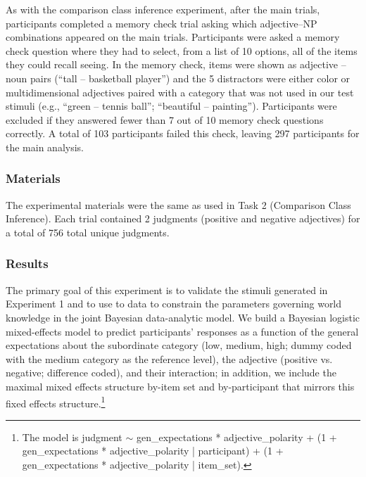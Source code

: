\documentclass[doc]{apa6}
\begin{document}
As with the comparison class inference experiment, after the main trials, participants completed a memory check trial asking which adjective--NP combinations appeared on the main trials. 
Participants were asked a memory check question where they had to select, from a list of 10 options, all of the items they could recall seeing. In the memory check, items were shown as adjective -- noun pairs (``tall -- basketball player'') and the 5 distractors were either color or multidimensional adjectives paired with a category that was not used in our test stimuli (e.g., ``green -- tennis ball''; ``beautiful -- painting'').
Participants were excluded if they answered fewer than 7 out of 10 memory check questions correctly.
A total of 103 participants failed this check, leaving 297 participants for the main analysis. 

\subsubsection{Materials}

The experimental materials were the same as used in Task 2 (Comparison Class Inference).
Each trial contained 2 judgments (positive and negative adjectives) for a total of 756 total unique judgments.

\subsubsection{Results}

The primary goal of this experiment is to validate the stimuli generated in Experiment 1 and to use to data to constrain the parameters governing world knowledge in the joint Bayesian data-analytic model. We build a Bayesian logistic mixed-effects model to predict participants' responses as a function of the general expectations about the subordinate category (low, medium, high; dummy coded with the medium category as the reference level), the adjective (positive vs. negative; difference coded), and their interaction; in addition, we include the maximal mixed effects structure by-item set and by-participant that mirrors this fixed effects structure.\footnote{
The model is judgment $\sim$ gen\_expectations * adjective\_polarity + (1 + gen\_expectations * adjective\_polarity | participant) + (1 + gen\_expectations * adjective\_polarity | item\_set).
}
\end{document}
